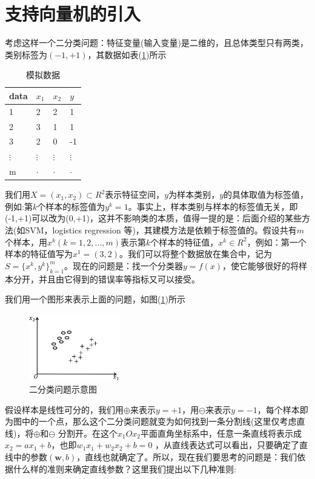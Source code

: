 \section{支持向量机的引入}
	考虑这样一个二分类问题：特征变量(输入变量)是二维的，且总体类型只有两类，类别标签为$(-1,+1)$，其数据如表(\ref{tab:SVM模拟数据})所示
	\begin{table}[htbp]
		\caption{模拟数据}
		\label{tab:SVM模拟数据}
		\centering
		\begin{tabular}{l|lll}
		\toprule
		data   & $x_1$    & $x_2$    & $y$ \\
		\midrule
		1      & 2      & 2      & 1 \\
		2      & 3      & 1      & 1 \\
		3      & 2      & 0      & -1 \\
		$\vdots$ & $\vdots$ & $\vdots$ & $\vdots$ \\
		m      & $\cdot$  & $\cdot$  & $\cdot$ \\
		\bottomrule
		\end{tabular}
	\end{table}
	\par
	我们用$X=(x_1,x_2)\subset R^2$表示特征空间，$y$为样本类别，$y$的具体取值为标签值，例如:第$k$个样本的标签值为$y^k=1$。事实上，样本类别与样本的标签值无关，即(-1,+1)可以改为(0,+1)，这并不影响类的本质，值得一提的是：后面介绍的某些方法(如SVM，logistics regression 等)，其建模方法是依赖于标签值的。假设共有$m$个样本，用$x^k(k=1,2,...,m)$表示第$k$个样本的特征值，$x^k\in R^2$，例如：第一个样本的特征值写为$x^1=(3,2)$。我们可以将整个数据放在集合中，记为$S=\{x^k,y^k\}_{k=1}^m$。现在的问题是：找一个分类器$y=f(x)$，使它能够很好的将样本分开，并且由它得到的错误率等指标又可以接受。
	\par
	我们用一个图形来表示上面的问题，如图(\ref{fig:二分类问题示意图})所示
		\begin{figure}[H]
		\centering
		\includegraphics[width=4cm]{images/SVM_BSVM_classify_of_two.jpg}
		\caption{二分类问题示意图}
		\label{fig:二分类问题示意图}
		\end{figure}
	假设样本是线性可分的，我们用$\oplus$来表示$y=+1$，用$\ominus$来表示$y=-1$，每个样本即为图中的一个点，那么这个二分类问题就变为如何找到一条分割线(这里仅考虑直线)，将$\oplus$和$\ominus$ 分割开。在这个$x_1Ox_2$平面直角坐标系中，任意一条直线将表示成$x_2=ax_1+b$，也即$w_1x_1+w_2x_2+b=0$ ，从直线表达式可以看出，只要确定了直线中的参数$(\mathbf w,b)$，直线也就确定了。所以，现在我们要思考的问题是：我们依据什么样的准则来确定直线参数？这里我们提出以下几种准则:
